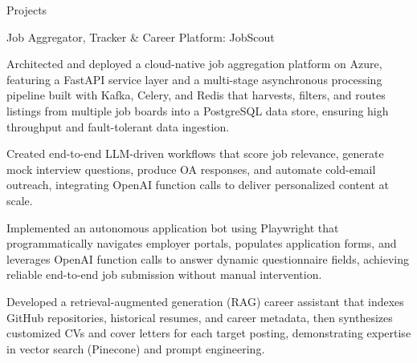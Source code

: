 \documentclass{resume}
\begin{document}
\vspace{-2mm}
\begin{rSection}{Projects}
\vspace{-1mm}

\fontsize{10}{12}\begin{rSubsection}
  {Job Aggregator, Tracker \& Career Platform: JobScout}{}{}{}
{\fontsize{9}{12}\selectfont

  \item Architected and deployed a cloud-native job aggregation platform on Azure, featuring a FastAPI service layer and a multi-stage asynchronous processing pipeline built with Kafka, Celery, and Redis that harvests, filters, and routes listings from multiple job boards into a PostgreSQL data store, ensuring high throughput and fault-tolerant data ingestion.

  \item Created end-to-end LLM-driven workflows that score job relevance, generate mock interview questions, produce OA responses, and automate cold-email outreach, integrating OpenAI function calls to deliver personalized content at scale.

  \item Implemented an autonomous application bot using Playwright that programmatically navigates employer portals, populates application forms, and leverages OpenAI function calls to answer dynamic questionnaire fields, achieving reliable end-to-end job submission without manual intervention.

  \item Developed a retrieval-augmented generation (RAG) career assistant that indexes GitHub repositories, historical resumes, and career metadata, then synthesizes customized CVs and cover letters for each target posting, demonstrating expertise in vector search (Pinecone) and prompt engineering.

}
\end{rSubsection}
\vspace{-2mm}

\end{rSection}
\end{document}
